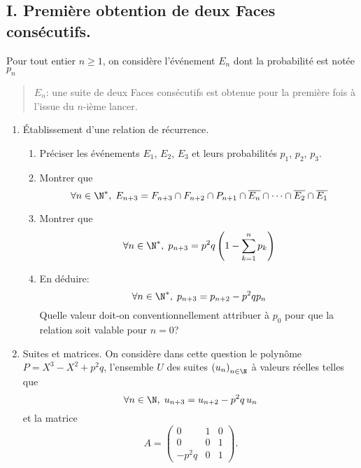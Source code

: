 \subsection*{I. Première obtention de deux Faces consécutifs.}
Pour tout entier $n\geq 1$, on considère l'événement $E_n$ dont la probabilité est notée $p_n$
\begin{quote}
 $E_n$: \og une suite de deux Faces consécutifs est obtenue pour la première fois à l'issue du $n$-ième lancer.\fg
\end{quote}
\begin{enumerate}
 \item \'Etablissement d'une relation de récurrence.
 \begin{enumerate}
 \item Préciser les événements $E_1$, $E_2$, $E_3$ et leurs probabilités $p_1$, $p_2$, $p_3$.
 \item Montrer que 
\begin{displaymath}
\forall n \in \N^*, \;  E_{n+3} = F_{n+3} \cap F_{n+2} \cap P_{n+1} \cap \overline{E_{n}} \cap \cdots \cap \overline{E_{2}} \cap \overline{E_{1}}
\end{displaymath}
 \item Montrer que 
\begin{displaymath}
\forall n \in \N^*, \;  p_{n+3} = p^2 q \left( 1 - \sum_{k=1}^{n}p_k\right) 
\end{displaymath}
 \item En déduire:
\begin{displaymath}
 \forall n\in \N^*, \; p_{n+3} = p_{n+2} - p^2 q p_n
\end{displaymath}
Quelle valeur doit-on conventionnellement attribuer à $p_0$ pour que la relation soit valable pour $n=0$?
\end{enumerate}

 \item Suites et matrices.\newline
On considère dans cette question le polynôme $P = X^3 - X^2 + p^2 q$, l'ensemble $U$ des suites $\left( u_n \right)_{n \in \N}$ à valeurs réelles telles que 
\begin{displaymath}
\forall n\in \N, \; u_{n+3} = u_{n+2} -p^2q\,u_n
\end{displaymath}
et la matrice
\begin{displaymath}
 A = 
 \begin{pmatrix}
0 & 1 & 0 \\ 0 & 0 & 1 \\ -p^2q & 0 & 1  
 \end{pmatrix}
.
\end{displaymath}


\end{enumerate}
